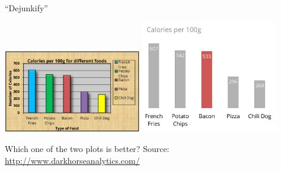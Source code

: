 \documentclass[aspectratio=169]{../latex_main/tntbeamer}  %
\begin{document}
	\begin{frame}{``Dejunkify''}
	    
	    \centering
	    \includegraphics[width=0.45\textwidth]{04_visualization/figure/bad_figure.png}
	    \includegraphics[width=0.45\textwidth]{04_visualization/figure/good_figure.png}
	    
	    Which one of the two plots is better?
	    {
        \footnotesize
        Source: \url{http://www.darkhorseanalytics.com/}
        }
	    
	\end{frame}
	
\end{document}
